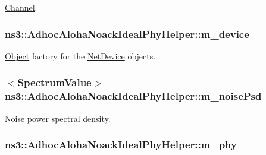 \hyperlink{classns3_1_1Channel}{Channel}. 

\subsubsection[{\texorpdfstring{m\+\_\+device}{m_device}}]{ ns3\+::\+Adhoc\+Aloha\+Noack\+Ideal\+Phy\+Helper\+::m\+\_\+device\hspace{0.3cm}{\ttfamily [protected]}}\hypertarget{classns3_1_1AdhocAlohaNoackIdealPhyHelper_a96861b31b956411f79c5585aca553bc7}{}\label{classns3_1_1AdhocAlohaNoackIdealPhyHelper_a96861b31b956411f79c5585aca553bc7}


\hyperlink{classns3_1_1Object}{Object} factory for the \hyperlink{classns3_1_1NetDevice}{Net\+Device} objects. 

\subsubsection[{\texorpdfstring{m\+\_\+noise\+Psd}{m_noisePsd}}]{$<${\bf Spectrum\+Value}$>$ ns3\+::\+Adhoc\+Aloha\+Noack\+Ideal\+Phy\+Helper\+::m\+\_\+noise\+Psd\hspace{0.3cm}{\ttfamily [protected]}}\hypertarget{classns3_1_1AdhocAlohaNoackIdealPhyHelper_a5452e6ebea4ea0d8a60ab4ed3d785a39}{}\label{classns3_1_1AdhocAlohaNoackIdealPhyHelper_a5452e6ebea4ea0d8a60ab4ed3d785a39}


Noise power spectral density. 

\subsubsection[{\texorpdfstring{m\+\_\+phy}{m_phy}}]{ ns3\+::\+Adhoc\+Aloha\+Noack\+Ideal\+Phy\+Helper\+::m\+\_\+phy\hspace{0.3cm}{\ttfamily [protected]}}\hypertarget{classns3_1_1AdhocAlohaNoackIdealPhyHelper_a808515d2431684570b6ad48f23099503}{}\label{classns3_1_1AdhocAlohaNoackIdealPhyHelper_a808515d2431684570b6ad48f23099503}


